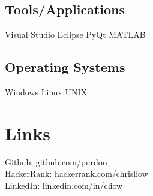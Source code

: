 \documentclass[letterpaper]{deedy-resume} %
\begin{document}
\begin{minipage}[t]{0.33\textwidth}
\subsection{Tools/Applications}
Visual Studio \textbullet{} Eclipse \textbullet{} PyQt \textbullet{} MATLAB

\sectionspace
\subsection{Operating Systems}
Windows \textbullet{} Linux \textbullet{} UNIX

\sectionspace %

\section{Links} 

Github: github.com/purdoo \\
HackerRank: hackerrank.com/chrisliow \\
LinkedIn: linkedin.com/in/cliow \\


\sectionspace %


\end{minipage} %
\hfill
%
%
\end{document}
